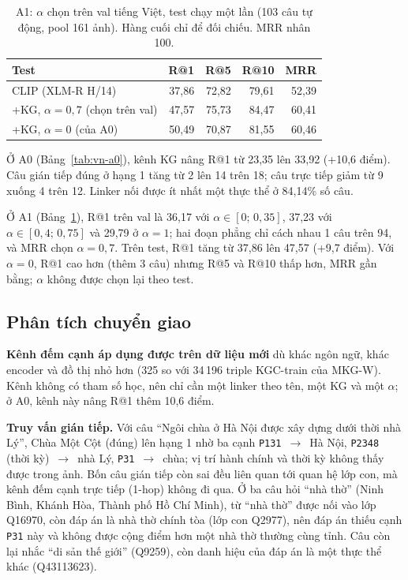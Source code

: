 \begin{table}[t]
\centering
\caption{A1: $\alpha$ chọn trên val tiếng Việt, test chạy một lần (103 câu tự động, pool 161 ảnh). Hàng cuối chỉ
để đối chiếu. MRR nhân 100.}
\label{tab:vn-a1}
\footnotesize
\begin{tabular}{@{}lrrrr@{}}
\toprule
Test & R@1 & R@5 & R@10 & MRR \\
\midrule
CLIP (XLM-R H/14) & 37,86 & 72,82 & 79,61 & 52,39 \\
+KG, $\alpha=0{,}7$ (chọn trên val) & 47,57 & 75,73 & 84,47 & 60,41 \\
+KG, $\alpha=0$ (của A0) & 50,49 & 70,87 & 81,55 & 60,46 \\
\bottomrule
\end{tabular}
\end{table}

Ở A0 (Bảng~\ref{tab:vn-a0}), kênh KG nâng R@1 từ 23,35 lên 33,92 (+10,6 điểm). Câu gián tiếp đúng ở hạng 1 tăng
từ 2 lên 14 trên 18; câu trực tiếp giảm từ 9 xuống 4 trên 12. Linker nối được ít nhất một thực thể ở 84,14\% số
câu.

Ở A1 (Bảng~\ref{tab:vn-a1}), R@1 trên val là 36,17 với $\alpha \in [0;\,0{,}35]$, 37,23 với
$\alpha \in [0{,}4;\,0{,}75]$ và 29,79 ở $\alpha=1$; hai đoạn phẳng chỉ cách nhau 1 câu trên 94, và MRR chọn
$\alpha=0{,}7$. Trên test, R@1 tăng từ 37,86 lên 47,57 (+9,7 điểm). Với $\alpha=0$, R@1 cao hơn (thêm 3 câu) nhưng R@5 và
R@10 thấp hơn, MRR gần bằng; $\alpha$ không được chọn lại theo test.

\subsection{Phân tích chuyển giao}\label{sec:vn-analysis}

\textbf{Kênh đếm cạnh áp dụng được trên dữ liệu mới} dù khác ngôn ngữ, khác encoder và đồ thị nhỏ hơn (325 so với
34\,196 triple KGC-train của MKG-W). Kênh không có tham số học, nên chỉ cần một linker theo tên, một KG và một $\alpha$; ở
A0, kênh này nâng R@1 thêm 10,6 điểm.

\textbf{Truy vấn gián tiếp.} Với câu ``Ngôi chùa ở Hà Nội được xây dựng dưới thời nhà Lý'', Chùa Một
Cột (đúng) lên hạng 1 nhờ ba cạnh \texttt{P131}~$\rightarrow$~Hà Nội, \texttt{P2348} (thời kỳ)~$\rightarrow$~nhà
Lý, \texttt{P31}~$\rightarrow$~chùa; vị trí hành chính và thời kỳ không thấy được trong ảnh. Bốn câu gián tiếp còn
sai đều liên quan tới quan hệ lớp con, mà kênh đếm cạnh trực tiếp (1-hop) không đi qua. Ở ba câu hỏi ``nhà thờ'' (Ninh Bình, Khánh Hòa, Thành phố Hồ
Chí Minh), từ ``nhà thờ'' được nối vào lớp Q16970, còn đáp án là nhà thờ chính tòa (lớp con Q2977), nên đáp án
thiếu cạnh \texttt{P31} này và không được cộng điểm hơn một nhà thờ thường cùng tỉnh. Câu còn lại nhắc
``di sản thế giới'' (Q9259), còn danh hiệu của đáp án là một thực thể khác (Q43113623).

